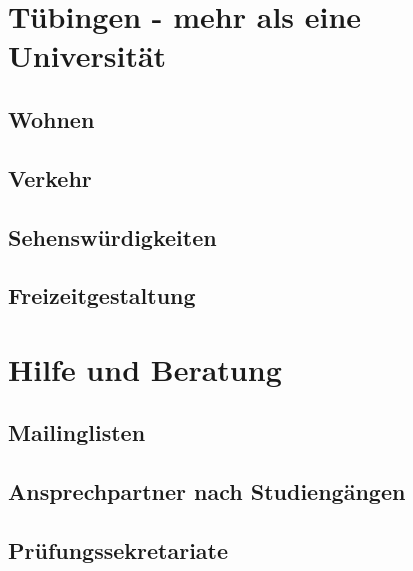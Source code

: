 \documentclass[12pt, a4paper]{article}
\newif\ifinfo
\begin{document}
\section{Tübingen - mehr als eine Universität}
\subsection{Wohnen}


\subsection{Verkehr}


\subsection{Sehenswürdigkeiten}

\pagebreak
\subsection{Freizeitgestaltung}


\newpage
\section{Hilfe und Beratung}
\ifinfo
	\subsection{Don't panic! -- Erste Hilfe: fsi}
	
\else
	
\fi

\subsection{Mailinglisten}
\ifinfo
	
\else
	
\fi

\ifinfo
	\subsection{Ansprechpartner nach Studiengängen}
	

	\subsection{Prüfungssekretariate}
	
\end{document}
